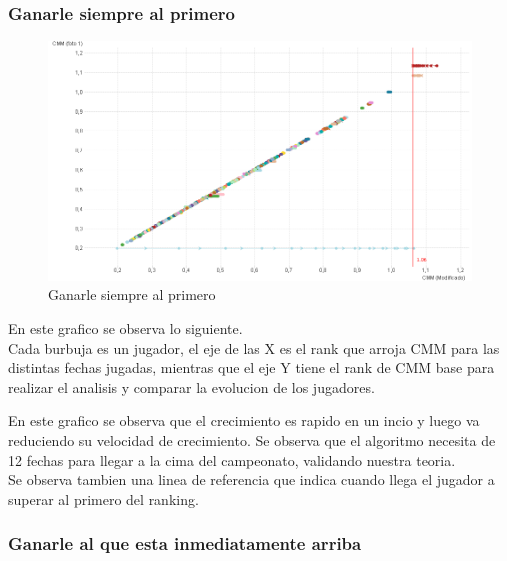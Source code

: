 \subsubsection{Ganarle siempre al primero}

\begin{figure}[H]
\centering
\includegraphics[width=1\textwidth]{IMG/estrategia 5.png}
\caption{Ganarle siempre al primero}
\label{fig:Ganarle siempre al primero}
\end{figure}

En este grafico se observa lo siguiente.\\
Cada burbuja es un jugador, el eje de las X es el rank que arroja CMM para las distintas fechas jugadas, mientras que el eje Y tiene el rank de CMM base para 
realizar el analisis y comparar la evolucion de los jugadores.

En este grafico se observa que el crecimiento es rapido en un incio y luego va reduciendo su velocidad de crecimiento.
Se observa que el algoritmo necesita de 12 fechas para llegar a la cima del campeonato, validando nuestra teoria.\\

Se observa tambien una linea de referencia que indica cuando llega el jugador a superar al primero del ranking.\\

\subsubsection{Ganarle al que esta inmediatamente arriba}
\\

